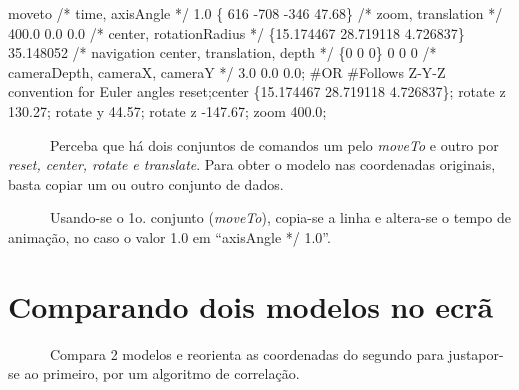 \documentclass[
  letterpaper,
  DIV=11,
  numbers=noendperiod]{scrreprt}
\newenvironment{Shaded}{\begin{snugshade}}{\end{snugshade}}
\newcommand{\CommentTok}[1]{\textcolor[rgb]{0.37,0.37,0.37}{#1}}
\newcommand{\DecValTok}[1]{\textcolor[rgb]{0.68,0.00,0.00}{#1}}
\newcommand{\ErrorTok}[1]{\textcolor[rgb]{0.68,0.00,0.00}{#1}}
\newcommand{\FloatTok}[1]{\textcolor[rgb]{0.68,0.00,0.00}{#1}}
\newcommand{\NormalTok}[1]{\textcolor[rgb]{0.00,0.23,0.31}{#1}}
\newcommand{\SpecialCharTok}[1]{\textcolor[rgb]{0.37,0.37,0.37}{#1}}
\newcommand{\StringTok}[1]{\textcolor[rgb]{0.13,0.47,0.30}{#1}}
\begin{document}
\begin{Shaded}
\begin{Highlighting}[]
\NormalTok{moveto }\SpecialCharTok{/}\ErrorTok{*}\NormalTok{ time, axisAngle }\SpecialCharTok{*}\ErrorTok{/} \FloatTok{1.0}\NormalTok{ \{ }\DecValTok{616} \SpecialCharTok{{-}}\DecValTok{708} \SpecialCharTok{{-}}\DecValTok{346} \FloatTok{47.68}\NormalTok{\} }\SpecialCharTok{/}\ErrorTok{*}\NormalTok{ zoom, translation }\SpecialCharTok{*}\ErrorTok{/}  \FloatTok{400.0} \FloatTok{0.0} \FloatTok{0.0}  \SpecialCharTok{/}\ErrorTok{*}\NormalTok{ center, rotationRadius }\SpecialCharTok{*}\ErrorTok{/}\NormalTok{ \{}\FloatTok{15.174467} \FloatTok{28.719118} \FloatTok{4.726837}\NormalTok{\} }\FloatTok{35.148052} \SpecialCharTok{/}\ErrorTok{*}\NormalTok{ navigation center, translation, depth }\SpecialCharTok{*}\ErrorTok{/}\NormalTok{ \{}\DecValTok{0} \DecValTok{0} \DecValTok{0}\NormalTok{\} }\DecValTok{0} \DecValTok{0} \DecValTok{0} \SpecialCharTok{/}\ErrorTok{*}\NormalTok{ cameraDepth, cameraX, cameraY }\SpecialCharTok{*}\ErrorTok{/}  \FloatTok{3.0} \FloatTok{0.0} \FloatTok{0.0}\NormalTok{;}
\CommentTok{\#OR}
\CommentTok{\#Follows Z{-}Y{-}Z convention for Euler angles}
\NormalTok{reset;center \{}\FloatTok{15.174467} \FloatTok{28.719118} \FloatTok{4.726837}\NormalTok{\}; rotate z }\FloatTok{130.27}\NormalTok{; rotate y }\FloatTok{44.57}\NormalTok{; rotate z }\SpecialCharTok{{-}}\FloatTok{147.67}\NormalTok{; zoom }\FloatTok{400.0}\NormalTok{;}
\end{Highlighting}
\end{Shaded}

~~~~~~Perceba que há dois conjuntos de comandos um pelo \emph{moveTo} e
outro por \emph{reset, center, rotate e translate}. Para obter o modelo
nas coordenadas originais, basta copiar um ou outro conjunto de dados.

~~~~~~Usando-se o 1o. conjunto (\emph{moveTo}), copia-se a linha e
altera-se o tempo de animação, no caso o valor 1.0 em ``axisAngle */
1.0''.

\section{Comparando dois modelos no
ecrã}\label{comparando-dois-modelos-no-ecruxe3}

~~~~~~Compara 2 modelos e reorienta as coordenadas do segundo para
justapor-se ao primeiro, por um algoritmo de correlação.

\begin{Shaded}
\end{Shaded}
\end{document}
